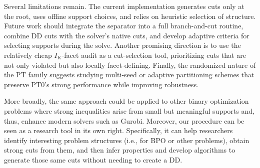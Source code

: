 Several limitations remain. The current implementation generates cuts only at the root, uses offline support choices, and relies on heuristic selection of structure. Future work should integrate the separator into a full branch-and-cut routine, combine DD cuts with the solver's native cuts, and develop adaptive criteria for selecting supports during the solve. Another promising direction is to use the relatively cheap $I_K$-facet audit as a cut-selection tool, prioritizing cuts that are not only violated but also locally facet-defining. Finally, the randomized nature of the PT family suggests studying multi-seed or adaptive partitioning schemes that preserve PT0's strong performance while improving robustness.

More broadly, the same approach could be applied to other binary optimization problems where strong inequalities arise from small but meaningful supports and, thus, enhance modern solvers such as Gurobi. Moreover, our procedure can be seen as a research tool in its own right. Specifically, it can help researchers identify interesting problem structures (i.e., for BPO or other problems), obtain strong cuts from them, and then infer properties and develop algorithms to generate those same cuts without needing to create a DD. 

